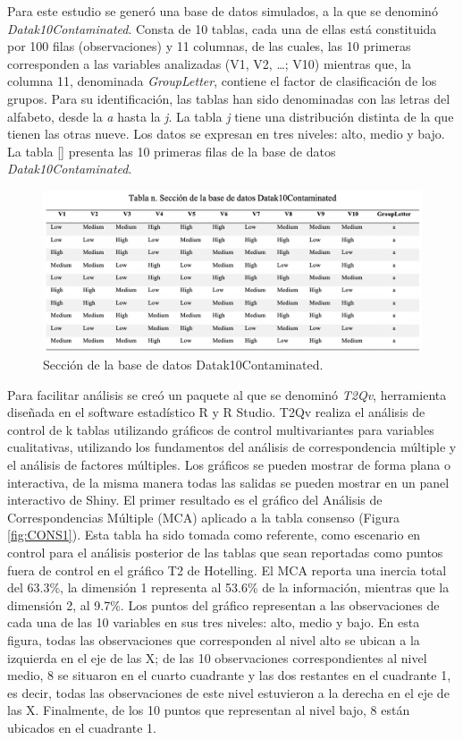 \documentclass[water,article,submit,moreauthors,pdftex]{mdpi}
\begin{document}
Para este estudio se generó una base de datos simulados, a la que se
denominó \emph{Datak10Contaminated}. Consta de 10 tablas, cada una de
ellas está constituida por 100 filas (observaciones) y 11 columnas, de
las cuales, las 10 primeras corresponden a las variables analizadas (V1,
V2, \ldots; V10) mientras que, la columna 11, denominada
\emph{GroupLetter}, contiene el factor de clasificación de los grupos.
Para su identificación, las tablas han sido denominadas con las letras
del alfabeto, desde la \emph{a} hasta la \emph{j}. La tabla \emph{j}
tiene una distribución distinta de la que tienen las otras nueve. Los
datos se expresan en tres niveles: alto, medio y bajo. La tabla \ref{}
presenta las 10 primeras filas de la base de datos
\emph{Datak10Contaminated}.

\begin{figure}[!ht]



\begin{center}\includegraphics[width=0.6\linewidth,]{tablabase} \end{center}

\caption{Sección de la base de datos Datak10Contaminated.}

\label{tab:tabladatos}
\end{figure}

Para facilitar análisis se creó un paquete al que se denominó
\emph{T2Qv}, herramienta diseñada en el software estadístico R y R
Studio. T2Qv realiza el análisis de control de k tablas utilizando
gráficos de control multivariantes para variables cualitativas,
utilizando los fundamentos del análisis de correspondencia múltiple y el
análisis de factores múltiples. Los gráficos se pueden mostrar de forma
plana o interactiva, de la misma manera todas las salidas se pueden
mostrar en un panel interactivo de Shiny. El primer resultado es el
gráfico del Análisis de Correspondencias Múltiple (MCA) aplicado a la
tabla consenso (Figura \ref{fig:CONS1}). Esta tabla ha sido tomada como
referente, como escenario en control para el análisis posterior de las
tablas que sean reportadas como puntos fuera de control en el gráfico T2
de Hotelling. El MCA reporta una inercia total del 63.3\%, la dimensión
1 representa al 53.6\% de la información, mientras que la dimensión 2,
al 9.7\%. Los puntos del gráfico representan a las observaciones de cada
una de las 10 variables en sus tres niveles: alto, medio y bajo. En esta
figura, todas las observaciones que corresponden al nivel alto se ubican
a la izquierda en el eje de las X; de las 10 observaciones
correspondientes al nivel medio, 8 se situaron en el cuarto cuadrante y
las dos restantes en el cuadrante 1, es decir, todas las observaciones
de este nivel estuvieron a la derecha en el eje de las X. Finalmente, de
los 10 puntos que representan al nivel bajo, 8 están ubicados en el
cuadrante 1.
\end{document}
